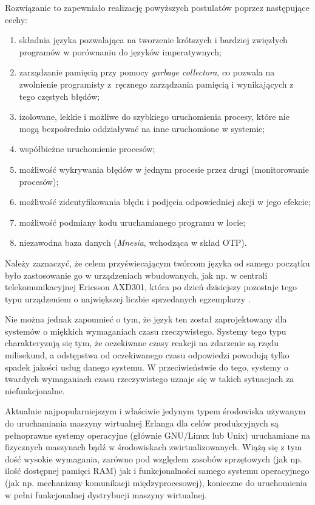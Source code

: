 Rozwiązanie to zapewniało realizację powyższych postulatów poprzez następujące cechy:
\begin{enumerate}
\item składnia języka pozwalająca na tworzenie krótszych i bardziej zwięzłych programów w porównaniu do języków imperatywnych;
\item zarządzanie pamięcią przy pomocy \emph{garbage collectora}, co pozwala na zwolnienie programisty z~ręcznego zarządzania pamięcią i wynikających z tego częstych błędów;
\item izolowane, lekkie i możliwe do szybkiego uruchomienia procesy, które nie mogą bezpośrednio oddziaływać na inne uruchomione w systemie;
\item współbieżne uruchomienie procesów;
\item możliwość wykrywania błędów w jednym procesie przez drugi (monitorowanie procesów);
\item możliwość zidentyfikowania błędu i podjęcia odpowiedniej akcji w jego efekcie;
\item możliwość podmiany kodu uruchamianego programu w locie;
\item niezawodna baza danych (\emph{Mnesia}, wchodząca w skład OTP).
\end{enumerate}

Należy zaznaczyć, że celem przyświecającym twórcom języka od samego początku było zastosowanie go w urządzeniach wbudowanych, jak np. w centrali telekomunikacyjnej Ericsson AXD301, która po dzień dzisiejszy pozostaje tego typu urządzeniem o największej liczbie sprzedanych egzemplarzy \cite{armstrong2003making}.

Nie można jednak zapomnieć o tym, że język ten został zaprojektowany dla systemów o miękkich wymaganiach czasu rzeczywistego. Systemy tego typu charakteryzują się tym, że oczekiwane czasy reakcji na zdarzenie są rzędu milisekund, a odstępstwa od oczekiwanego czasu odpowiedzi powodują tylko spadek jakości usług danego systemu. W przeciwieństwie do tego, systemy o twardych wymaganiach czasu rzeczywistego uznaje się w takich sytuacjach za niefunkcjonalne.

Aktualnie najpopularniejszym i właściwie jedynym typem środowiska używanym do uruchamiania maszyny wirtualnej Erlanga dla celów produkcyjnych są pełnoprawne systemy operacyjne (głównie GNU/Linux lub Unix) uruchamiane na fizycznych maszynach bądź w środowiskach zwirtualizowanych. Wiążą się z tym dość wysokie wymagania, zarówno pod względem zasobów sprzętowych (jak np. ilość dostępnej pamięci RAM) jak i funkcjonalności samego systemu operacyjnego (jak np. mechanizmy komunikacji międzyprocesowej), konieczne do uruchomienia w pełni funkcjonalnej dystrybucji maszyny wirtualnej.

